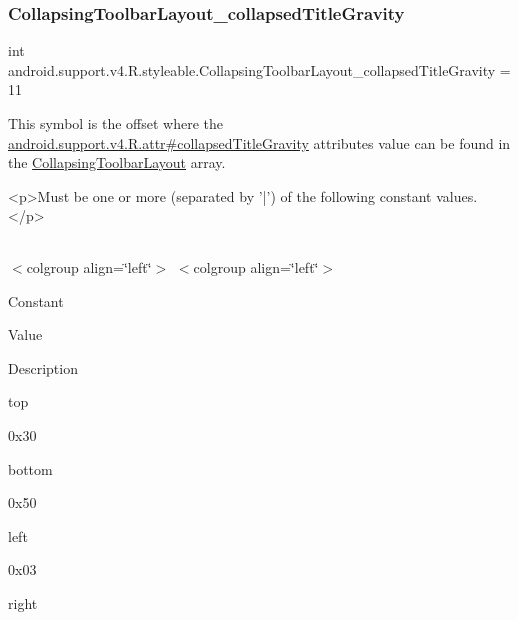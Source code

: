 \mbox{\label{classandroid_1_1support_1_1v4_1_1R_1_1styleable_a116fc8e3a3a97d7ee07ca793adfc6443}} 
\subsubsection{\texorpdfstring{Collapsing\+Toolbar\+Layout\+\_\+collapsed\+Title\+Gravity}{CollapsingToolbarLayout\_collapsedTitleGravity}}
{\footnotesize\ttfamily int android.\+support.\+v4.\+R.\+styleable.\+Collapsing\+Toolbar\+Layout\+\_\+collapsed\+Title\+Gravity = 11\hspace{0.3cm}{\ttfamily [static]}}

This symbol is the offset where the \hyperlink{classandroid_1_1support_1_1v4_1_1R_1_1attr_a6ab8e7ec74147d5da3f84ceae4fa0d09}{android.\+support.\+v4.\+R.\+attr\#collapsed\+Title\+Gravity} attribute\textquotesingle{}s value can be found in the \hyperlink{classandroid_1_1support_1_1v4_1_1R_1_1styleable_a91b20e27088c910353d38c1efde32aa9}{Collapsing\+Toolbar\+Layout} array.

\begin{DoxyVerb}      <p>Must be one or more (separated by '|') of the following constant values.</p>
\end{DoxyVerb}
 \tabulinesep=1mm
\begin{longtabu} spread 0pt [c]{*{0}{|X[-1]}|}
\hline
\end{longtabu}
$<$colgroup align=\char`\"{}left\char`\"{}$>$ $<$colgroup align=\char`\"{}left\char`\"{}$>$ 

Constant

Value

Description 

{\ttfamily top}

0x30

{\ttfamily bottom}

0x50

{\ttfamily left}

0x03

{\ttfamily right}

